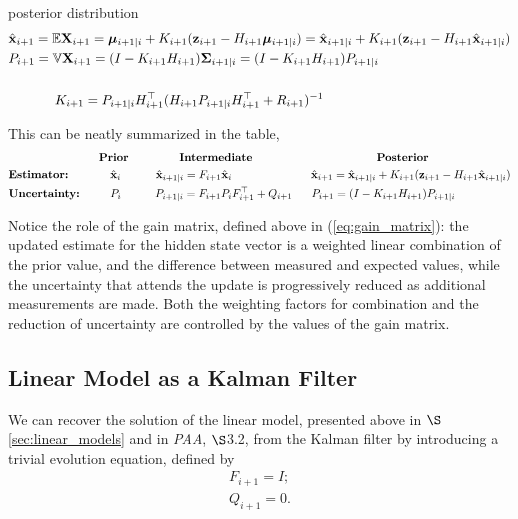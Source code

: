 \documentclass[12pt, twoside, draft]{article}
\begin{document}
posterior distribution
\begin{align}
&\hat{\mathbf{x}}_{i+1} = \mathbb{E} \mathbf{X}_{i+1} = \boldsymbol{\mu}_{i+1|i} + K_{i+1} (\mathbf{z}_{i+1} - H_{i+1} \boldsymbol{\mu}_{i+1|i}) = \hat{\mathbf{x}}_{i+1|i} + K_{i+1} (\mathbf{z}_{i+1} - H_{i+1} \hat{\mathbf{x}}_{i+1|i} ) \\
&P_{i+1} = \mathbb{V}\mathbf{X}_{i+1} = (I - K_{i+1} H_{i+1}) \boldsymbol{\Sigma}_{i+1|i} = (I - K_{i+1} H_{i+1}) P_{i+1|i} \\ \notag \\
&\hspace{35pt} K_{i+1} = P_{i+1|i} H_{i+1}^\top (H_{i+1} P_{i+1|i} H_{i+1}^\top + R_{i+1})^{-1}
\end{align}

This can be neatly summarized in the table,
\begin{align}
&\hspace{80pt} \textbf{Prior} \hspace{45pt} \textbf{Intermediate} \hspace{110pt} \textbf{Posterior} \notag \\
&\textbf{Estimator:} \hspace{37pt} \hat{\mathbf{x}}_i \hspace{31pt} \hat{\mathbf{x}}_{i+1|i} = F_{i+1} \hat{\mathbf{x}}_i \hspace{70pt} \hat{\mathbf{x}}_{i+1} = \hat{\mathbf{x}}_{i+1|i} + K_{i+1} (\mathbf{z}_{i+1} - H_{i+1} \hat{\mathbf{x}}_{i+1|i} ) \notag \\
&\textbf{Uncertainty:} \hspace{27pt} P_i \hspace{30pt} P_{i+1|i} = F_{i+1} P_i F_{i+1}^\top + Q_{i+1} \hspace{17pt} P_{i+1} = (I - K_{i+1} H_{i+1}) P_{i+1|i} \notag
\end{align}

Notice the role of the gain matrix, defined above in (\ref{eq:gain_matrix}): the updated estimate for the hidden state vector is a weighted linear combination of the prior value, and the difference between measured and expected values, while the uncertainty that attends the update is progressively reduced as additional measurements are made.  Both the weighting factors for combination and the reduction of uncertainty are controlled by the values of the gain matrix.

\subsection{Linear Model as a Kalman Filter}
We can recover the solution of the linear model, presented above in $\S$\ref{sec:linear_models} and in \textit{PAA}, $\S$3.2, from the Kalman filter by introducing a trivial evolution equation, defined by
\begin{align}
F_{i+1} = I; \\
Q_{i+1} = 0.
\end{align} 
\end{document}
